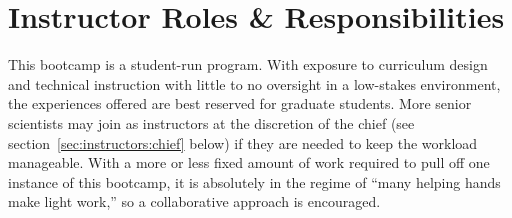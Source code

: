 
\section{Instructor Roles \& Responsibilities}
\label{sec:instructors}
\noindent
This bootcamp is a student-run program.
With exposure to curriculum design and technical instruction with little
to no oversight in a low-stakes environment, the experiences offered are best
reserved for graduate students.
More senior scientists may join as instructors at the discretion of the chief
(see section~\ref{sec:instructors:chief} below) if they are needed to keep the
workload manageable.
With a more or less fixed amount of work required to pull off one instance of
this bootcamp, it is absolutely in the regime of ``many helping hands make
light work,'' so a collaborative approach is encouraged.

